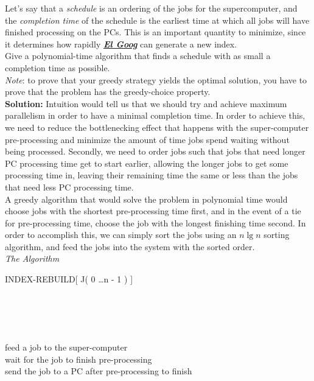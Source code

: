 \documentclass[11pts]{article}
\begin{document}
\begin{enumerate}
Let’s say that a \emph{schedule}
is an ordering of the jobs for the supercomputer, and the \emph{completion
time} of the schedule is the earliest time at which all jobs will have
finished processing on the PCs. This is an important quantity to minimize,
since it determines how rapidly \textbf{\textit{\underline{El Goog}}} can
generate a new index. \\

Give a polynomial-time algorithm that finds a schedule with as small a 
completion time as possible. \\

\textit{Note}: to prove that your greedy strategy yields the optimal
solution, you have to prove that the problem has the greedy-choice property. \\

  \textbf{Solution:} Intuition would tell us that we should try and achieve
  maximum parallelism in order to have a minimal completion time. In order to
  achieve this, we need to reduce the bottlenecking effect that happens
  with the super-computer pre-processing and minimize the amount of time
  jobs spend waiting without being processed. Secondly, we need to order
  jobs such that jobs that need longer PC processing time get to start
  earlier, allowing the longer jobs to get some processing time in, leaving
  their remaining time the same or less than the jobs that need less PC
  processing time. \\

  A greedy algorithm that would solve the problem in
  polynomial time would choose jobs with the shortest pre-processing time
  first, and in the event of a tie for pre-processing time, choose the job
  with the longest finishing time second. In order to accomplish this, we
  can simply sort the jobs using an $n\lg{n}$ sorting algorithm, and feed
  the jobs into the system with the sorted order. \\

  \textit{The Algorithm} \\
\begin{algorithm}{INDEX-REBUILD}[ J( 0 \dots n - 1 ) ]{
   }

   \\
   \\
   \\
  \do \\
    feed a job to the super-computer \\
    wait for the job to finish pre-processing \\
    send the job to a PC after pre-processing to finish
  \qrof \\
  \qstop {}
  

\end{algorithm}
\end{enumerate}
\end{document}
